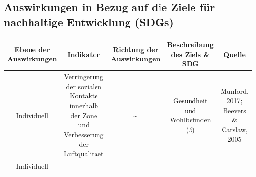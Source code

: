 \documentclass[
]{book}
\begin{document}
\hypertarget{auswirkungen-in-bezug-auf-die-ziele-fuxfcr-nachhaltige-entwicklung-sdgs-9}{%
\subsection*{Auswirkungen in Bezug auf die Ziele für nachhaltige Entwicklung (SDGs)}\label{auswirkungen-in-bezug-auf-die-ziele-fuxfcr-nachhaltige-entwicklung-sdgs-9}}

\begin{longtable}[]{@{}ccccc@{}}
\toprule
\begin{minipage}[b]{0.17\columnwidth}\centering
Ebene der Auswirkungen\strut
\end{minipage} & \begin{minipage}[b]{0.16\columnwidth}\centering
Indikator\strut
\end{minipage} & \begin{minipage}[b]{0.17\columnwidth}\centering
Richtung der Auswirkungen\strut
\end{minipage} & \begin{minipage}[b]{0.17\columnwidth}\centering
Beschreibung des Ziels \& SDG\strut
\end{minipage} & \begin{minipage}[b]{0.17\columnwidth}\centering
Quelle\strut
\end{minipage}\tabularnewline
\midrule
\endhead
\begin{minipage}[t]{0.17\columnwidth}\centering
Individuell\strut
\end{minipage} & \begin{minipage}[t]{0.16\columnwidth}\centering
Verringerung der sozialen Kontakte innerhalb der Zone und Verbesserung der Luftqualitaet\strut
\end{minipage} & \begin{minipage}[t]{0.17\columnwidth}\centering
\textbf{\textasciitilde{}}\strut
\end{minipage} & \begin{minipage}[t]{0.17\columnwidth}\centering
Gesundheit und Wohlbefinden (\emph{3})\strut
\end{minipage} & \begin{minipage}[t]{0.17\columnwidth}\centering
Munford, 2017; Beevers \& Carslaw, 2005\strut
\end{minipage}\tabularnewline
\begin{minipage}[t]{0.17\columnwidth}\centering
Individuell\strut

\end{minipage}
\end{longtable}
\end{document}
